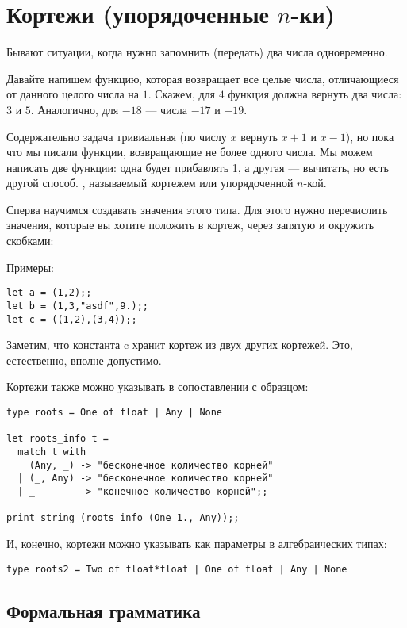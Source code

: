 \section{Кортежи (упорядоченные $n$-ки)}

Бывают ситуации, когда нужно запомнить (передать) два числа одновременно.

Давайте напишем функцию, которая возвращает все целые числа, отличающиеся от 
данного целого числа на $1$. 
Скажем, для $4$ функция должна вернуть два числа: $3$ и $5$.
Аналогично, для $-18$ --- числа $-17$ и $-19$.

Содержательно задача тривиальная (по числу $x$ вернуть $x+1$ и $x-1$),
но пока что мы писали функции, возвращающие не более одного числа.
Мы можем написать две функции: одна будет прибавлять 1, а другая --- вычитать,
но есть другой способ.
, называемый кортежем или
упорядоченной $n$-кой.

Сперва научимся создавать значения этого типа. Для этого нужно перечислить
значения, которые вы хотите положить в кортеж, через запятую и окружить 
скобками:

Примеры:
\begin{verbatim}
let a = (1,2);;
let b = (1,3,"asdf",9.);;
let c = ((1,2),(3,4));;
\end{verbatim}
Заметим, что константа c хранит кортеж из двух других кортежей. Это, 
естественно, вполне допустимо.

Кортежи также можно указывать в сопоставлении с образцом:

\begin{verbatim}
type roots = One of float | Any | None

let roots_info t =
  match t with
    (Any, _) -> "бесконечное количество корней"
  | (_, Any) -> "бесконечное количество корней"
  | _        -> "конечное количество корней";;

print_string (roots_info (One 1., Any));;
\end{verbatim}

И, конечно, кортежи можно указывать как параметры в алгебраических типах:

\begin{verbatim}
type roots2 = Two of float*float | One of float | Any | None
\end{verbatim}

\subsection{Формальная грамматика}

